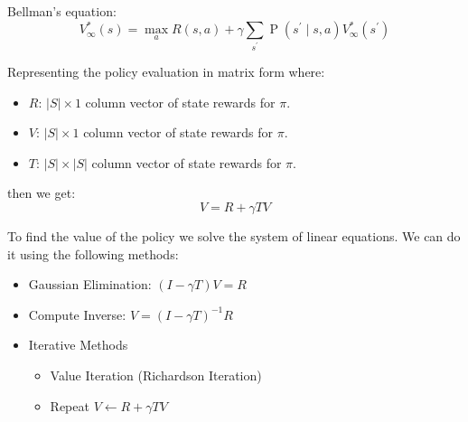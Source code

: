 \documentclass[12pt]{article}
\begin{document}
            Bellman's equation:
            $$V_{\infty}^{*}(s)=\max _{a} R(s, a)+\gamma \sum_{s^{\prime}} \operatorname{P}\left(s^{\prime} \mid s, a\right) V_{\infty}^{*}\left(s^{\prime}\right)$$

            Representing the policy evaluation in matrix form where:
            \begin{itemize}
                \item $R$: $|S| \times 1$ column vector of state rewards for $\pi$.
                \item $V$: $|S| \times 1$ column vector of state rewards for $\pi$.
                \item $T$: $|S| \times |S|$ column vector of state rewards for $\pi$.
            \end{itemize}

            then we get:
            $$ V = R + \gamma TV $$

            To find the value of the policy we solve the system of linear equations. We can do it using the following
            methods:

            \begin{itemize}
                \item Gaussian Elimination: $(I - \gamma T)V = R$
                \item Compute Inverse: $V = (I - \gamma T)^{-1}R$
                \item Iterative Methods \begin{itemize}
                    \item Value Iteration (Richardson Iteration)
                    \item Repeat $V \gets R + \gamma TV$
                \end{itemize}
            \end{itemize}
           
\printindex
\end{document}
